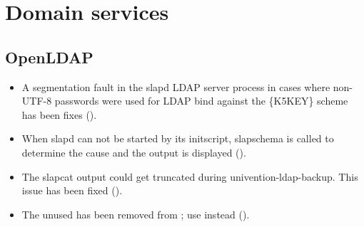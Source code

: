 




\section{Domain services}

\subsection{OpenLDAP}
\begin{itemize}
\item A segmentation fault in the slapd LDAP server process in cases where
non-UTF-8 passwords were used for LDAP bind against the \{K5KEY\} scheme has
been fixes ().

\item When slapd can not be started by its initscript, slapschema is called to determine the cause and the output is displayed ().

\item The slapcat output could get truncated during univention-ldap-backup.
This issue has been fixed ().

\item The unused  has been removed from ; use  instead ().
\end{itemize}

